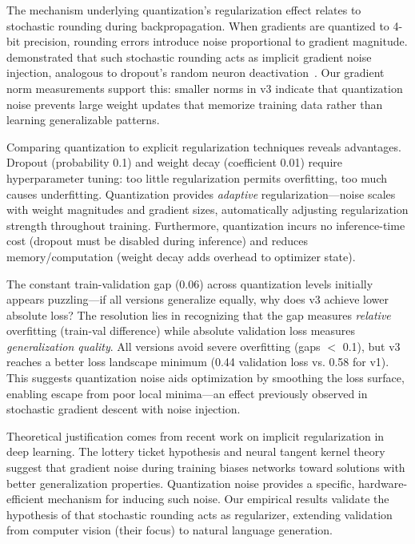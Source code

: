 \documentclass[pdflatex,sn-basic]{sn-jnl}
\begin{document}
The mechanism underlying quantization's regularization effect relates to stochastic rounding during backpropagation. When gradients are quantized to 4-bit precision, rounding errors introduce noise proportional to gradient magnitude. \cite{gupta2015deep} demonstrated that such stochastic rounding acts as implicit gradient noise injection, analogous to dropout's random neuron deactivation~\citep{srivastava2014dropout}. Our gradient norm measurements support this: smaller norms in v3 indicate that quantization noise prevents large weight updates that memorize training data rather than learning generalizable patterns.

Comparing quantization to explicit regularization techniques reveals advantages. Dropout (probability 0.1) and weight decay (coefficient 0.01) require hyperparameter tuning: too little regularization permits overfitting, too much causes underfitting. Quantization provides \textit{adaptive} regularization—noise scales with weight magnitudes and gradient sizes, automatically adjusting regularization strength throughout training. Furthermore, quantization incurs no inference-time cost (dropout must be disabled during inference) and reduces memory/computation (weight decay adds overhead to optimizer state).

The constant train-validation gap (0.06) across quantization levels initially appears puzzling—if all versions generalize equally, why does v3 achieve lower absolute loss? The resolution lies in recognizing that the gap measures \textit{relative} overfitting (train-val difference) while absolute validation loss measures \textit{generalization quality}. All versions avoid severe overfitting (gaps $<$ 0.1), but v3 reaches a better loss landscape minimum (0.44 validation loss vs. 0.58 for v1). This suggests quantization noise aids optimization by smoothing the loss surface, enabling escape from poor local minima—an effect previously observed in stochastic gradient descent with noise injection.

Theoretical justification comes from recent work on implicit regularization in deep learning. The lottery ticket hypothesis and neural tangent kernel theory suggest that gradient noise during training biases networks toward solutions with better generalization properties. Quantization noise provides a specific, hardware-efficient mechanism for inducing such noise. Our empirical results validate the hypothesis of \cite{gupta2015deep} that stochastic rounding acts as regularizer, extending validation from computer vision (their focus) to natural language generation.
\end{document}
